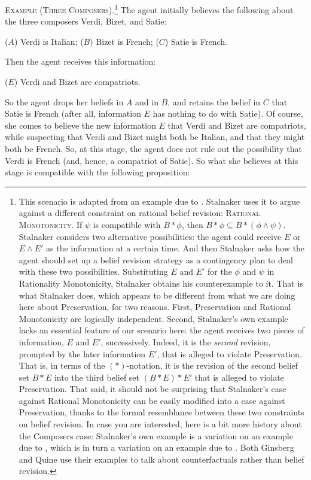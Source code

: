 	\xm \textsc{Example (Three Composers).}\footnote
		{
		This scenario is adapted from an example due to \citet{stalnaker1994nonmonotonic}. Stalnaker uses it to argue against a different constraint on rational belief revision: \op 
			\xm \textsc{Rational Monotonicity.} If $\psi$ is compatible with $B * \phi$, then $B * \phi \subseteq B * (\phi \wedge \psi)$. 
		\ed Stalnaker considers two alternative possibilities: the agent could receive $E$ or $E\wedge E'$ as the information at a certain time. And then Stalnaker asks how the agent should set up a belief revision strategy as a contingency plan to deal with these two possibilities. Substituting $E$ and $E'$ for the $\phi$ and $\psi$ in Rationality Monotonicity, Stalnaker obtains his counterexample to it. That is what Stalnaker does, which appears to be different from what we are doing here about Preservation, for two reasons. First, Preservation and Rational Monotonicity are logically independent. Second, Stalnaker's own example lacks an essential feature of our scenario here: the agent receives two pieces of information, $E$ and $E'$, successively. Indeed, it is the {\em second} revision, prompted by the later information $E'$, that is alleged to violate Preservation. That is, in terms of the $(*)$-notation, it is the revision of the second belief set $B * E$ into the third belief set $(B * E) * E'$ that is alleged to violate Preservation.  That said, it should not be surprising that Stalnaker's case against Rational Monotonicity can be easily modified into a case against Preservation, thanks to the formal resemblance between these two constraints on belief revision. In case you are interested, here is a bit more history about the Composers case: Stalnaker's own example is a variation on an example due to \citet{ginsberg1986counterfactuals}, which is in turn a variation on an example due to \citet{quine1982methods}. Both Ginsberg and Quine use their examples to talk about counterfactuals rather than belief revision.
		}
	The agent initially believes the following about the three composers Verdi, Bizet, and Satie: \op

		\xm ($A$) Verdi is Italian;
		\xm ($B$) Bizet is French;
		\xm ($C$) Satie is French. 

	\ed Then the agent receives this information: \op

		\xm ($E$) Verdi and Bizet are compatriots. 

	\ed So the agent drops her beliefs in $A$ and in $B$, and retains the belief in $C$ that Satie is French (after all, information $E$ has nothing to do with Satie). Of course, she comes to believe the new information $E$ that Verdi and Bizet are compatriots, while suspecting that Verdi and Bizet might both be Italian, and that they might both be French. So, at this stage, the agent does not rule out the possibility that Verdi is French (and, hence, a compatriot of Satie). So what she believes at this stage is compatible with the following proposition: \op

